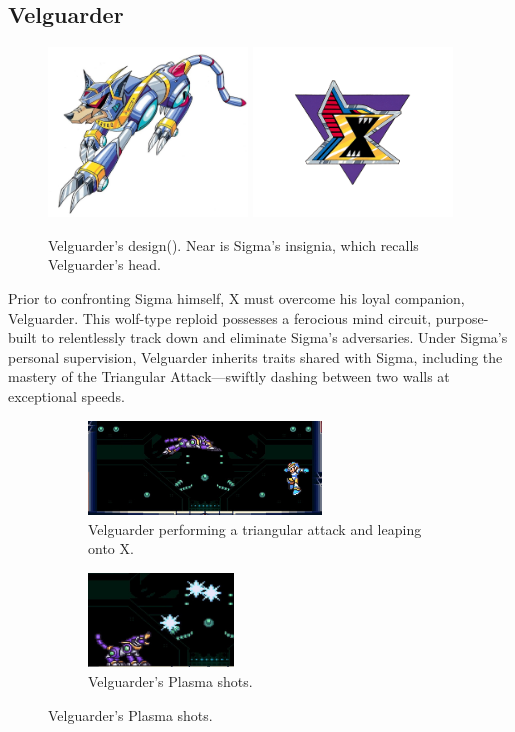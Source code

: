 \subsection{Velguarder}\label{boss:Velguarder}
\begin{figure}[htp]
	\centering
	\includegraphics[height=4.5cm]{figures/X1/Sigma_stages/Velguarder.jpg}
	\includegraphics[height=4.5cm]{figures/X1/Sigma_stages/Sigma_logo.png}
	\caption{Velguarder's design(\cite{book:MMX_Complete_art}). Near is Sigma's insignia, which recalls Velguarder's head.}
\end{figure}
Prior to confronting Sigma himself, X must overcome his loyal companion, Velguarder. This wolf-type reploid possesses a ferocious mind circuit, purpose-built to relentlessly track down and eliminate Sigma's adversaries. Under Sigma's personal supervision, Velguarder inherits traits shared with Sigma, including the mastery of the Triangular Attack—swiftly dashing between two walls at exceptional speeds.
\begin{figure}[htp]
	\centering
	\begin{subfigure}[t]{.49\linewidth}
		\centering
		\includegraphics[height=2.5cm]{figures/X1/Sigma_stages/Velguarder_leap_1.jpg}
		\caption{Velguarder performing a triangular attack and leaping onto X.}
	\end{subfigure}
	\begin{subfigure}[t]{0.40\linewidth}
		\centering
		\includegraphics[height=2.5cm]{figures/X1/Sigma_stages/Velguarder_plasma.jpg}
		\caption{Velguarder's Plasma shots.}
	\end{subfigure}
\end{figure}
